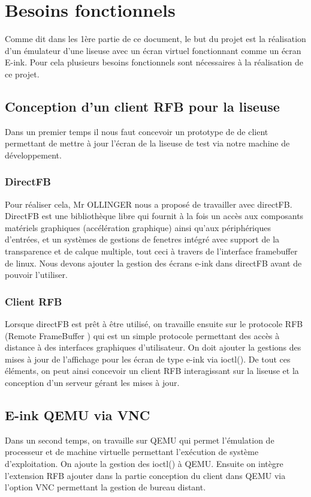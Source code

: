 \chapter{Besoins fonctionnels}

Comme dit dans les 1ère partie de ce document, le but du projet est la réalisation d'un émulateur d'une liseuse avec un écran virtuel fonctionnant comme un écran E-ink. Pour cela plusieurs besoins fonctionnels sont nécessaires à la réalisation de ce projet.  

\section{Conception d'un client RFB pour la liseuse}

Dans un premier temps il nous faut concevoir un prototype de de client permettant de mettre à jour l'écran de la liseuse de test via notre machine de développement.

\subsection{DirectFB}
 Pour réaliser cela, Mr OLLINGER nous a proposé de travailler avec directFB. DirectFB est une bibliothèque libre qui fournit à la fois un accès aux composants matériels graphiques (accélération graphique) ainsi qu'aux périphériques d'entrées, et un systèmes de gestions de fenetres intégré avec support de la transparence et de calque multiple, tout ceci à travers de l'interface framebuffer de linux. Nous devons ajouter la gestion des écrans e-ink dans directFB avant de pouvoir l'utiliser. 
\subsection{Client RFB}
Lorsque directFB est prêt à être utilisé, on travaille ensuite sur le protocole RFB (Remote FrameBuffer ) qui est un simple protocole permettant des accès à distance à des interfaces graphiques d'utilisateur. On doit ajouter la gestions des mises à jour de l'affichage pour les écran de type e-ink via ioctl(). De tout ces éléments, on peut ainsi concevoir un client RFB interagissant sur la liseuse et la conception d'un serveur gérant les mises à jour. 

\section{E-ink QEMU via VNC}

Dans un second temps, on travaille sur QEMU qui permet l'émulation de processeur et de machine virtuelle permettant l'exécution de système d'exploitation. On ajoute la gestion des ioctl() à QEMU. Ensuite on intègre l'extension RFB ajouter dans la partie conception du client dans QEMU via l'option VNC permettant la gestion de bureau distant.

